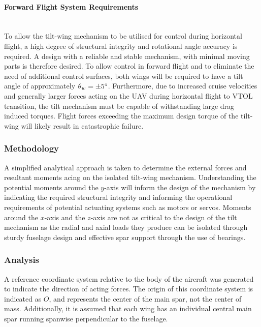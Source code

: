 \paragraph{Forward Flight System Requirements}
\\
To allow the tilt-wing mechanism to be utilised for control during horizontal flight, a high degree of structural integrity and rotational angle accuracy is required. A design with a reliable and stable mechanism, with minimal moving parts is therefore desired. To allow control in forward flight and to eliminate the need of additional control surfaces, both wings will be required to have a tilt angle of approximately \(\theta_w=\pm5\degree\). Furthermore, due to increased cruise velocities and generally larger forces acting on the UAV during horizontal flight to VTOL transition, the tilt mechanism must be capable of withstanding large drag induced torques. Flight forces exceeding the maximum design torque of the tilt-wing will likely result in catastrophic failure. 

\subsubsection{Methodology}
A simplified analytical approach is taken to determine the external forces and resultant moments acing on the isolated tilt-wing mechanism. Understanding the potential moments around the $y$-axis will inform the design of the mechanism by indicating the required structural integrity and informing the operational requirements of potential actuating systems such as motors or servos. Moments around the $x$-axis and the $z$-axis are not as critical to the design of the tilt mechanism as the radial and axial loads they produce can be isolated through sturdy fuselage design and effective spar support through the use of bearings.

\subsubsection{Analysis}
A reference coordinate system relative to the body of the aircraft was generated to indicate the direction of acting forces. The origin of this coordinate system is indicated as $O$, and represents the center of the main spar, not the center of mass. Additionally, it is assumed that each wing has an individual central main spar running spanwise perpendicular to the fuselage. \\

